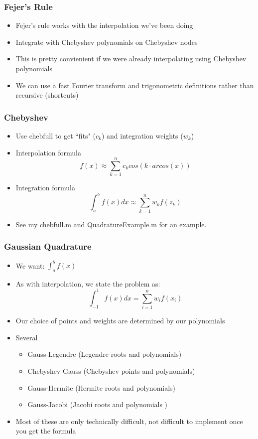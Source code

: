 \documentclass{beamer}
\begin{document}
\begin{frame}
\frametitle[alignment=center]{Fejer's Rule}
\begin{itemize}
\item Fejer's rule works with the interpolation we've been doing
\bigskip
\item Integrate with Chebyshev polynomials on Chebyshev nodes
\bigskip
\item This is pretty convienient if we were already interpolating using Chebyshev polynomials
\bigskip
\item We can use a fast Fourier transform and trigonometric definitions rather than recursive (shortcuts)
\end{itemize}
\end{frame}

\begin{frame}
\scriptsize
\frametitle[alignment=center]{Chebyshev}
\begin{itemize}
\item Use chebfull to get ``fits" ($c_k$) and integration weights ($w_k$)
\bigskip
\item Interpolation formula
$$f(x) \approx \sum_{k=1}^n c_k cos(k \cdot arcos(x)) $$
\item Integration formula
$$\int_a^bf(x)dx \approx \sum_{k=1}^n w_kf(z_k)$$
\item See my chebfull.m and QuadratureExample.m for an example.
\end{itemize}
\end{frame}

\begin{frame}
\frametitle[alignment=center]{Gaussian Quadrature}
\begin{itemize}
\item We want: $\int_{a}^bf(x)$
\item As with interpolation, we state the problem as:
$$\int_{-1}^1f(x)dx=\sum_{i=1}^nw_if(x_i)$$
\item Our choice of points and weights are determined by our polynomials
\item Several  
\begin{itemize}
\item Gauss-Legendre (Legendre roots and polynomials)
\item Chebyshev-Gauss (Chebyshev points and polynomials)
\item Gauss-Hermite (Hermite roots and polynomials)
\item Gauss-Jacobi (Jacobi roots and polynomials )
\end{itemize}
\item Most of these are only technically difficult, not difficult to implement once you get the formula
\end{itemize}
\end{frame}
\end{document}
